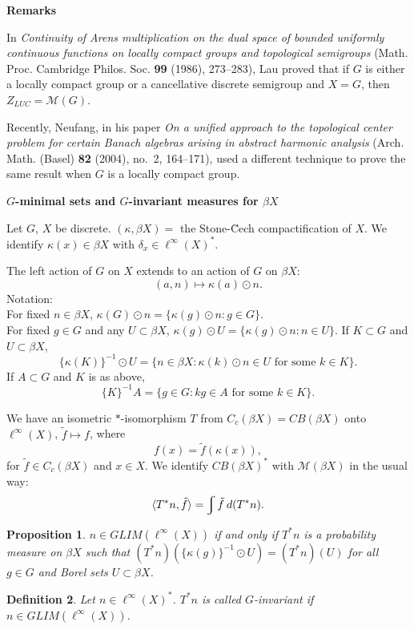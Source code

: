 \documentclass[landscape]{slides}
\newtheorem{defn}{Definition}
\newtheorem{proposition}[defn]{Proposition}
\begin{document}
\begin{slide}
{\bf Remarks}

In \emph{Continuity of {A}rens multiplication on the dual space of
  bounded uniformly continuous functions on locally compact groups and
  topological semigroups} (Math. Proc. Cambridge Philos. Soc. \textbf{99}
  (1986), 273--283), Lau
proved that if $G$ is either a locally compact group or a cancellative discrete semigroup
and $X=G$, then $Z_{LUC} = \mathcal{M}(G)$.

Recently, Neufang, in his paper \emph{On a unified approach to the topological center problem for
  certain {B}anach algebras arising in abstract harmonic analysis} (Arch. Math.
  (Basel) \textbf{82} (2004), no.~2, 164--171),
used a different technique to prove the same result when $G$ is a locally compact group.
\end{slide}

\begin{slide}
{\bf $G$-minimal sets and $G$-invariant measures for $\beta X$}

Let $G$, $X$ be discrete.  $(\kappa, \beta X) =$ the Stone-\u{C}ech compactification
of $X$.  We identify $\kappa (x) \in \beta X$ with $\delta_x \in \ell^\infty (X)^*$.

The left action of $G$ on $X$ extends to an action of $G$ on $\beta X$:
\[
(a, n) \mapsto \kappa (a) \odot n.
\]
Notation:\\
For fixed $n\in \beta X$,
$\kappa(G) \odot n = \{\kappa(g) \odot n : g\in G\}$.\\
For fixed $g\in G$ and any $U\subset \beta X$,
$\kappa(g) \odot U = \{\kappa(g) \odot n: n\in U\}$.
If $K\subset G$ and $U\subset \beta X$,
\[
\{\kappa(K)\}^{-1} \odot U = \{ n\in \beta X : \kappa(k) \odot n \in U\text{ for some }k\in K\}.
\]
If $A\subset G$ and $K$ is as above,
\[
\{K\}^{-1}A = \{g\in G: kg\in A\text{ for some }k\in K\}.
\]
\end{slide}

\begin{slide}
We have an isometric $*$-isomorphism $T$ from $C_c (\beta X) = CB(\beta X)$ onto $\ell^\infty (X)$,
$\tilde{f}\mapsto f$, where
\[
f(x) = \tilde{f}(\kappa(x)),
\]
for $\tilde{f}\in C_c (\beta X)$ and $x\in X$.  We identify
$CB(\beta X)^*$ with $\mathcal{M}(\beta X)$ in the usual way:
\[
\langle T^*n, \tilde{f}\rangle = \int\tilde{f}\:d(T^*n).\\
\]


\begin{proposition}\label{probmeas}
$n\in GLIM(\ell^\infty(X))$ if and only if
$T^* n$ is a probability measure on $\beta X$ such that
$(T^*n)(\{\kappa(g)\}^{-1} \odot U) = (T^*n)(U)$ for all $g\in G$ and Borel sets $U\subset \beta X$.\\
\end{proposition}

\begin{defn}
Let $n\in \ell^\infty(X)^*$.  $T^*n$ is called $G$-{\it invariant} if $n \in GLIM(\ell^\infty(X))$.
\end{defn}
\end{slide}
\end{document}

